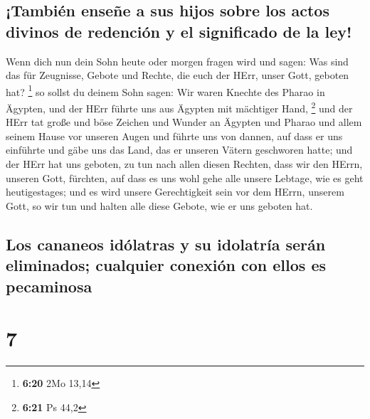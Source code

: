 \hypertarget{tambiuxe9n-enseuxf1e-a-sus-hijos-sobre-los-actos-divinos-de-redenciuxf3n-y-el-significado-de-la-ley}{%
\subsection{¡También enseñe a sus hijos sobre los actos divinos de
redención y el significado de la
ley!}\label{tambiuxe9n-enseuxf1e-a-sus-hijos-sobre-los-actos-divinos-de-redenciuxf3n-y-el-significado-de-la-ley}}

 Wenn dich nun dein Sohn heute oder morgen fragen wird
und sagen: Was sind das für Zeugnisse, Gebote und Rechte, die euch der
HErr, unser Gott, geboten hat? \footnote{\textbf{6:20} 2Mo 13,14}
 so sollst du deinem Sohn sagen: Wir waren Knechte des
Pharao in Ägypten, und der HErr führte uns aus Ägypten mit mächtiger
Hand, \footnote{\textbf{6:21} Ps 44,2}  und der HErr tat
große und böse Zeichen und Wunder an Ägypten und Pharao und allem seinem
Hause vor unseren Augen  und führte uns von dannen, auf
dass er uns einführte und gäbe uns das Land, das er unseren Vätern
geschworen hatte;  und der HErr hat uns geboten, zu tun
nach allen diesen Rechten, dass wir den HErrn, unseren Gott, fürchten,
auf dass es uns wohl gehe alle unsere Lebtage, wie es geht
heutigestages;  und es wird unsere Gerechtigkeit sein vor
dem HErrn, unserem Gott, so wir tun und halten alle diese Gebote, wie er
uns geboten hat.

\hypertarget{los-cananeos-iduxf3latras-y-su-idolatruxeda-seruxe1n-eliminados-cualquier-conexiuxf3n-con-ellos-es-pecaminosa}{%
\subsection{Los cananeos idólatras y su idolatría serán eliminados;
cualquier conexión con ellos es
pecaminosa}\label{los-cananeos-iduxf3latras-y-su-idolatruxeda-seruxe1n-eliminados-cualquier-conexiuxf3n-con-ellos-es-pecaminosa}}

\hypertarget{section-6}{%
\section{7}\label{section-6}}


